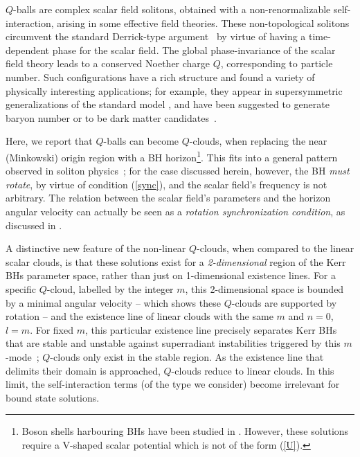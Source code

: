 \bigskip

$Q$-balls are complex scalar field solitons, obtained with a non-renormalizable self-interaction, arising in some effective field theories. 
These non-topological solitons circumvent the standard Derrick-type argument~\cite{Derrick:1964ww} by virtue of having a
time-dependent phase for the scalar field.
The global phase-invariance of the scalar field theory leads to a conserved Noether
charge $Q$, corresponding to particle number.
Such configurations have a rich structure and
found a variety
of physically interesting applications;
for example, they appear in supersymmetric generalizations of the standard model \cite{Kusenko:1997zq}, 
and have been suggested to generate baryon number or to be dark matter candidates~\cite{Kusenko:1997si}.




Here, we report that $Q$-balls can become $Q$-clouds, when replacing the near (Minkowski) origin region with a BH horizon\footnote{
Boson shells harbouring BHs have been studied in \cite{Kleihaus:2010ep}.
However, these solutions require a V-shaped scalar potential which
is not of the form (\ref{U}).}. This fits into a general pattern observed in soliton physics~\cite{Bizon:1994dh,Volkov:1998cc,Herdeiro:2014ima}; for the case discussed herein, however, the BH \textit{must rotate}, by virtue of condition (\ref{sync}), and the scalar field's frequency is not arbitrary. The relation between the scalar field's parameters and the horizon angular velocity can actually be seen as a \textit {rotation synchronization condition}, as discussed in \cite{Benone:2014ssa}. 

A distinctive new feature of the non-linear $Q$-clouds, when compared to the linear scalar clouds,
is that these solutions exist for a \textit{2-dimensional} region of the Kerr BHs parameter space, rather than just on 1-dimensional existence lines. For a specific $Q$-cloud, labelled by the integer $m$, this 2-dimensional space is bounded by a minimal angular velocity -- which shows these $Q$-clouds are supported by rotation -- and the existence line of linear clouds with the same $m$ and $n=0$, $l=m$. For fixed $m$, this particular existence line precisely separates Kerr BHs that are stable and unstable against superradiant instabilities triggered by this $m$-mode~\cite{Benone:2014ssa}; $Q$-clouds only exist in the stable region.  As the existence line that delimits their domain is approached, $Q$-clouds reduce to linear clouds. In this limit, the self-interaction terms (of the type we consider) become irrelevant for bound state solutions.

